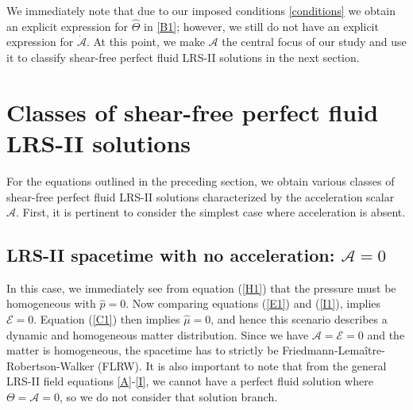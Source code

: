 \documentclass[abstract=on,notitlepage,superscriptaddress,nofootinbib,aps,preprint,prd]{revtex4}
\newcommand{\0}{^{(0)}}
\newcommand{\1}{^{(1)}}
\newcommand{\2}{^{(2)}}
\newcommand{\3}{{}^{(3)}}
\begin{document}
We immediately note that due to our imposed conditions \eqref{conditions} we obtain an explicit expression for $\hat{\Theta}$ in \eqref{B1}; however, we still do not have an explicit expression for $\dot{\mathcal{A}}$. At this point, we make $\mathcal{A}$ the central focus of our study and use it to classify shear-free perfect fluid LRS-II  solutions in the next section.


\section{Classes of shear-free perfect fluid LRS-II  solutions}
For the equations outlined in the preceding section, we obtain various classes of shear-free perfect fluid LRS-II solutions characterized by the acceleration scalar $\mathcal{A}$. First, it is pertinent to consider the simplest case where acceleration is absent.



\subsection{LRS-II spacetime with no acceleration: $\mathcal{A} = 0$}\label{no_accn}

In this case, we immediately see from equation (\ref{H1}) that the pressure must be homogeneous with $\hat{p}=0$. Now comparing equations (\ref{E1}) and (\ref{I1}), implies $  \mathcal{E}=0$.
Equation (\ref{C1}) then implies $\hat{\mu}=0$, and hence this scenario describes a dynamic and homogeneous matter distribution.
Since we have $\mathcal{A} = \mathcal{E} = 0$ and the matter is homogeneous, the spacetime has to strictly be Friedmann-Lema\^itre-Robertson-Walker (FLRW). It is also important to note that from the general LRS-II field equations \eqref{A}-\eqref{I}, we cannot have a perfect fluid solution where $\Theta = \mathcal{A}=0$, so we do not consider that solution branch. 


 
\end{document}
